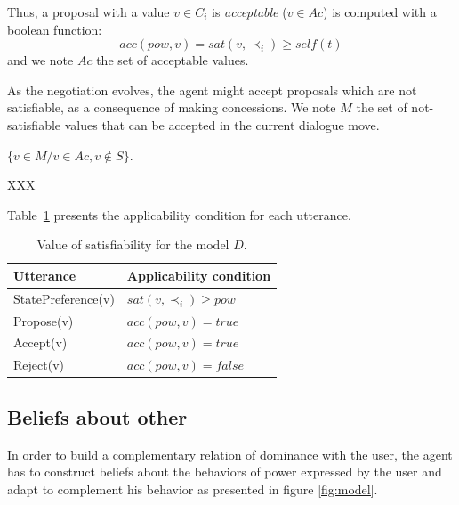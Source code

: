 \documentclass[sigconf]{aamas}  %
\begin{document}
	Thus, a proposal with a value $v \in C_i$ is \emph{acceptable} ($v \in Ac$) is computed with a boolean function:
	\begin{equation}
	acc(pow, v) = sat(v, \prec_i) \geq self(t)
	\end{equation}	
	and we note $Ac$ the set of acceptable values.
	
	As the negotiation evolves, the agent might accept proposals which are not satisfiable, as a consequence of making concessions. We note $M$ the set of not-satisfiable values that can be accepted in the current dialogue move.
	
	$\{v \in M / v \in Ac, v \notin S\}$.
	
	
	
	
	XXX
	
	Table~\ref{tab:utt} presents the applicability condition for each utterance.
		
		\begin{table}
			\centering
			\begin{tabular}  {|l|l|}
				\hline
				Utterance & Applicability condition \\
				\hline
				StatePreference(v) & $sat(v, \prec_i) \geq pow$ \\
				\hline 
				Propose(v) & $acc(pow, v) = true$ \\
				\hline
				Accept(v)  & $acc(pow, v) = true$ \\
				\hline
				Reject(v) & $acc(pow, v) = false$ \\
				\hline
			\end{tabular}
			\caption{Value of satisfiability for the model $D$.}
			\label{tab:utt}
		\end{table}
	
	\subsection{Beliefs about other}
	
	In order to build a complementary relation of dominance with the user, the agent has to construct beliefs about the behaviors of power expressed by the user and adapt to complement his behavior as presented in figure \ref{fig:model}.
	
\end{document}
